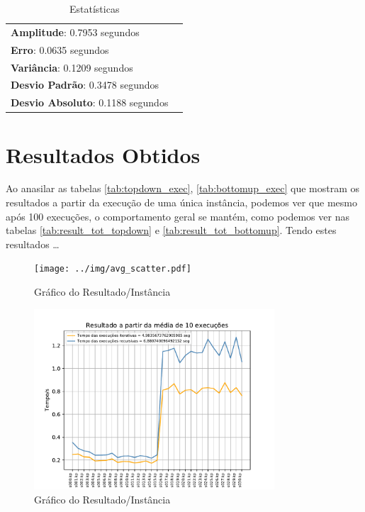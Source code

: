 \documentclass[a4paper, 12pt]{article}
\begin{document}
\vspace{-15pt}

\begin{table}[!htb]
    \begin{tabular}{ll}
        {\bf Amplitude}: 0.7953 segundos\\
        {\bf Erro}: 0.0635 segundos\\
        {\bf Variância}: 0.1209 segundos\\
        {\bf Desvio Padrão}: 0.3478 segundos\\
        {\bf Desvio Absoluto}: 0.1188 segundos
    \end{tabular}
    \caption{Estatísticas}
    \label{tab:estatistica_tot_bottomup}
\end{table}
\newpage
\section{Resultados Obtidos}
Ao anasilar as tabelas \ref{tab:topdown_exec}, \ref{tab:bottomup_exec} que mostram os resultados a
partir da execução de uma única instância, podemos ver que mesmo após 100 execuções, o comportamento geral
se mantém, como podemos ver nas tabelas \ref{tab:result_tot_topdown} e \ref{tab:result_tot_bottomup}.
Tendo estes resultados \dots

\begin{figure}[!htb]
    \centering
    \texttt{[image: ../img/avg\_scatter.pdf]}
    \caption{Gráfico do Resultado/Instância}
    \label{fig:avg_scatter}
\end{figure}
\begin{figure}[!htb]
    \centering
    \includegraphics[width=0.8\textwidth]{../img/avg_result.pdf}
    \caption{Gráfico do Resultado/Instância}
    \label{fig:avg_result}
\end{figure}
\clearpage
\end{document}
